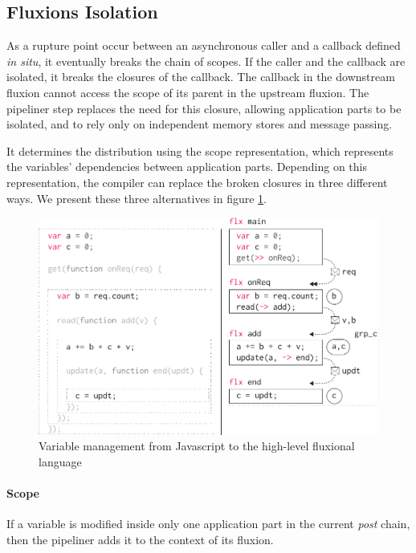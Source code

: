 \subsection{Fluxions Isolation} \label{chapter5:flx:isolation}

As a rupture point occur between an asynchronous caller and a callback defined \textit{in situ}, it eventually breaks the chain of scopes.
If the caller and the callback are isolated, it breaks the closures of the callback.
The callback in the downstream fluxion cannot access the scope of its parent in the upstream fluxion.
The pipeliner step replaces the need for this closure, allowing application parts to be isolated, and to rely only on independent memory stores and message passing.

It determines the distribution using the scope representation, which represents the variables' dependencies between application parts.
Depending on this representation, the compiler can replace the broken closures in three different ways.
We present these three alternatives in figure \ref{fig:states}.

\begin{figure}[h!]
  \centering
  \includegraphics[width=0.7\linewidth]{../resources/states.pdf}
  \caption{Variable management from Javascript to the high-level fluxional language}
  \label{fig:states}
\end{figure}

\paragraph{Scope}
If a variable is modified inside only one application part in the current \textit{post} chain, then the pipeliner adds it to the context of its fluxion.

